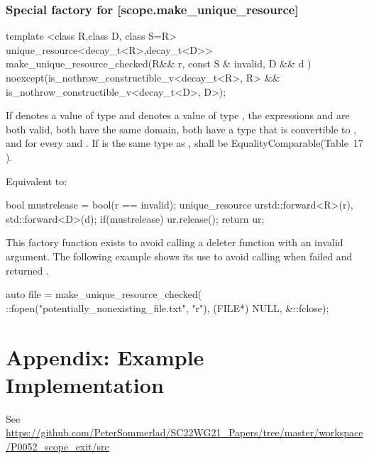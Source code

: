 \documentclass[ebook,11pt,article]{memoir}
\begin{document}
\begin{itemdescr}
\pnum
\returns {}
\end{itemdescr}

\newpage
\subsection {Special factory for  [scope.make_unique_resource]}

\begin{itemdecl}
template <class R,class D, class S=R>
unique_resource<decay_t<R>,decay_t<D>>
make_unique_resource_checked(R&& r, const S & invalid, D && d ) 
noexcept(is_nothrow_constructible_v<decay_t<R>, R> &&
         is_nothrow_constructible_v<decay_t<D>, D>);
\end{itemdecl}

\begin{itemdescr}
\pnum
\requires 
If  denotes a value of type  and  denotes a
value of type , the expressions  and 
are both valid, both have the same domain, both have a type that is
convertible to , and  for every  and
. If  is the same type as ,  shall be EqualityComparable(Table~17
). 

\pnum
\effects Equivalent to:
\begin{codeblock}
  bool mustrelease = bool(r == invalid);
  unique_resource ur{std::forward<R>(r), std::forward<D>(d)};
  if(mustrelease) ur.release();
  return ur;
\end{codeblock}

\pnum
\begin{note}
This factory function exists to avoid calling a deleter function with an invalid argument. The following example shows its use to avoid calling  when  failed and returned .
\end{note}

\pnum
\begin{example}
\begin{codeblock}
auto file = make_unique_resource_checked(
  ::fopen("potentially_nonexisting_file.txt", "r"), 
    (FILE*) NULL, &::fclose);
\end{codeblock}
\end{example}

\end{itemdescr}

\chapter{Appendix: Example Implementation} 
See 
\url{https://github.com/PeterSommerlad/SC22WG21_Papers/tree/master/workspace/P0052_scope_exit/src}
\end{document}
